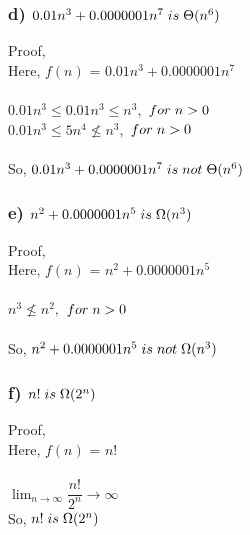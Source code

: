 \documentclass[10pt, a4paper]{article}
\begin{document}
	
	\subsubsection*{d) $0.01n^3+0.0000001n^7\hspace{0.1cm} is\hspace{0.1cm} \Theta(n^6)$}
	{Proof,\\}
	Here, {$f(n)$} = {$0.01n^3+0.0000001n^7$} \\\\
	{$ 0.01n^3 \leq 0.01n^3 \leq n^3 , $ \hspace{.5cm}$ for\hspace{0.1cm}n>0$\\}
	{$ 0.01n^3 \leq 5n^4 \nleq n^3, $ \hspace{.5cm}$ for\hspace{0.1cm}n>0$\\}
	\\
	{So,\hspace{0.1cm} $0.01n^3+0.0000001n^7\hspace{0.1cm} is\hspace{0.1cm} not \hspace{0.1cm} \Theta(n^6)$}
	
	\subsubsection*{e) $n^2+0.0000001n^5\hspace{0.1cm} is\hspace{0.1cm} \Omega(n^3)$}
	{Proof,\\}
	Here, {$f(n)$} = {$n^2+0.0000001n^5$} \\\\
	{$ n^3 \nleq n^2  , $ \hspace{.5cm}$ for\hspace{0.1cm}n>0$\\}
	\\
	{So,\hspace{0.1cm} $n^2+0.0000001n^5\hspace{0.1cm} is\hspace{0.1cm} not \hspace{0.1cm} \Omega(n^3)$}
	
	\subsubsection*{f) $n!\hspace{.1cm}is\hspace{.1cm}\Omega(2^n)$}
	{Proof,\\}
	Here, {$f(n)$} = {$n!$} \\\\
	{$\lim_{n\to\infty}\dfrac{n!}{2^n} \rightarrow \infty$\\}
	{So,\hspace{0.1cm} $n!\hspace{0.1cm} is\hspace{0.1cm} \Omega(2^n)$}
	
\end{document}
